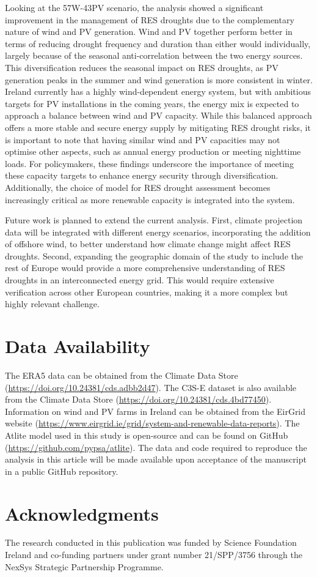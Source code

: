 \documentclass[preprint, 12pt]{elsarticle}
\begin{document}
Looking at the 57W-43PV scenario, the analysis showed a significant improvement in the management of RES droughts due to the complementary nature of wind and PV generation. Wind and PV together perform better in terms of reducing drought frequency and duration than either would individually, largely because of the seasonal anti-correlation between the two energy sources. This diversification reduces the seasonal impact on RES droughts, as PV generation peaks in the summer and wind generation is more consistent in winter. Ireland currently has a highly wind-dependent energy system, but with ambitious targets for PV installations in the coming years, the energy mix is expected to approach a balance between wind and PV capacity. While this balanced approach offers a more stable and secure energy supply by mitigating RES drought risks, it is important to note that having similar wind and PV capacities may not optimise other aspects, such as annual energy production or meeting nighttime loads. For policymakers, these findings underscore the importance of meeting these capacity targets to enhance energy security through diversification. Additionally, the choice of model for RES drought assessment becomes increasingly critical as more renewable capacity is integrated into the system.

Future work is planned to extend the current analysis. First, climate projection data will be integrated with different energy scenarios, incorporating the addition of offshore wind, to better understand how climate change might affect RES droughts. Second, expanding the geographic domain of the study to include the rest of Europe would provide a more comprehensive understanding of RES droughts in an interconnected energy grid. This would require extensive verification across other European countries, making it a more complex but highly relevant challenge.

\section*{Data Availability}

The ERA5 data can be obtained from the Climate Data Store (\url{https://doi.org/10.24381/cds.adbb2d47}). The C3S-E dataset is also available from the Climate Data Store (\url{https://doi.org/10.24381/cds.4bd77450}). Information on wind and PV farms in Ireland can be obtained from the EirGrid website (\url{https://www.eirgrid.ie/grid/system-and-renewable-data-reports}). The Atlite model used in this study is open-source and can be found on GitHub (\url{https://github.com/pypsa/atlite}). The data and code required to reproduce the analysis in this article will be made available upon acceptance of the manuscript in a public GitHub repository.

\section*{Acknowledgments}

The research conducted in this publication was funded by Science Foundation Ireland and co-funding partners under grant number 21/SPP/3756 through the NexSys Strategic Partnership Programme.



\end{document}
